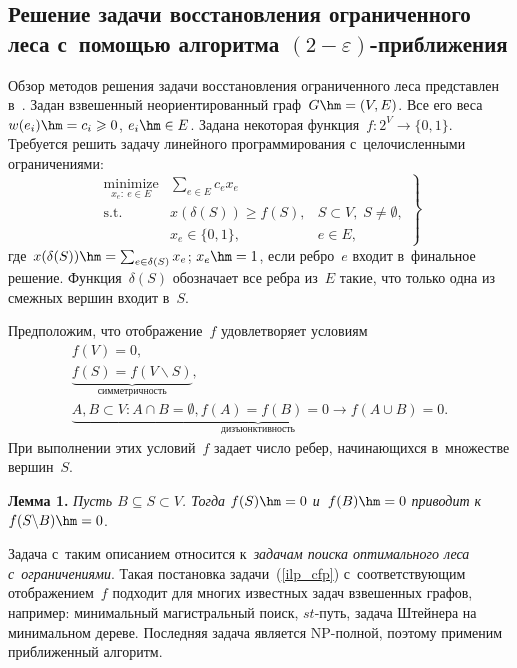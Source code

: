 \begin{multicols}{2}
\vspace*{-9pt}

\section{Решение задачи восстановления ограниченного леса с~помощью алгоритма 
$(2-\varepsilon)$-приближения}

\vspace*{-3pt}

Обзор методов решения задачи восстановления ограниченного леса представлен 
в~\cite{goemans1995general}. Задан взвешенный неориентированный граф~$G\hm=(V,E)$. 
Все его веса~$w(e_i)\hm=c_i\geqslant 0$, $e_i\hm\in E$. Задана некоторая 
функция~$f:2^{V}\to \{0, 1\}$. Требуется решить задачу линейного 
программирования с~целочисленными ограничениями:
\begin{equation}
\left.
\begin{array}{rll}
\underset{x_e:~e\in E}{\mbox{minimize}} & \displaystyle \sum\limits_{e\in E}c_ex_e &\\[6pt]
\mbox{s.t.} & x\left(\delta(S)\right)\geqslant f(S), & S \subset V, \; S \not= \emptyset,\\[6pt]
& x_e\in\{0,1\}, & e\in E,
\end{array}
\right\}
\label{ilp_cfp}
\end{equation}
где~$x(\delta(S))\hm=\sum\nolimits_{e\in \delta(S)}x_e$; $x_e\hm=1$, если 
ребро~$e$ входит в~финальное решение. Функция~$\delta(S)$ обозначает все ребра 
из~$E$ такие, что только одна из смежных вершин входит в~$S$.

Предположим, что отображение~$f$ удовлетворяет условиям
\begin{gather*}
f(V) = 0,\\
 \underbrace{f(S)=f(V\backslash S)}_{\mathrm{симметричность}},\\
\underbrace{A,B\!\subset\! V\!: A\!\cap\! B\! =\! \emptyset, f(A)\!=\!f(B)\!=\!0\!\to\! f(A\!\cup\! B)\! =\! 0}_{\mathrm{дизъюнктивность}}.
\end{gather*}
При выполнении этих условий~$f$ задает число ребер, начинающихся в~множестве 
вершин~$S$.

\smallskip

\noindent
\textbf{Лемма 1.}
\textit{Пусть $B\subseteq S\subset V$. Тогда $f(S) \hm= 0$ и~$f(B) \hm= 0$ приводит к}~$f(S\backslash B) \hm= 0$.

\smallskip

Задача с~таким описанием относится к~\textit{задачам поиска оптимального леса с~ограничениями}. 
Такая постановка задачи~(\ref{ilp_cfp}) с~соответствующим 
отображением~$f$ подходит для многих известных задач взвешенных графов, 
например: минимальный магистральный поиск, $st$-путь, задача Штейнера на 
минимальном дереве. Последняя задача является NP-полной, поэтому применим 
приближенный алгоритм.


\end{multicols}
